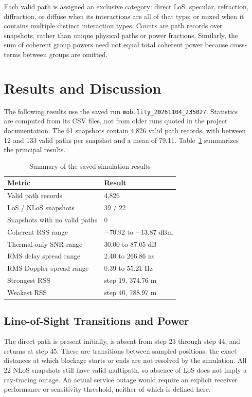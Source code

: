 \documentclass[conference]{IEEEtran}
\begin{document}
Each valid path is assigned an exclusive category: direct LoS; specular, refraction, diffraction, or diffuse when its interactions are all of that type; or mixed when it contains multiple distinct interaction types. Counts are path records over snapshots, rather than unique physical paths or power fractions. Similarly, the sum of coherent group powers need not equal total coherent power because cross-terms between groups are omitted.

\section{Results and Discussion}
The following results use the saved run \texttt{mobility\_20261104\_235027}. Statistics are computed from its CSV files, not from older runs quoted in the project documentation. The 61 snapshots contain 4,826 valid path records, with between 12 and 133 valid paths per snapshot and a mean of 79.11. Table~\ref{tab:results} summarizes the principal results.

\begin{table}[t]
\caption{Summary of the saved simulation results}
\label{tab:results}\centering
\begin{tabular}{@{}ll@{}}\toprule
Metric & Result \\ \midrule
Valid path records & 4,826 \\
LoS / NLoS snapshots & 39 / 22 \\
Snapshots with no valid paths & 0 \\
Coherent RSS range & $-70.92$ to $-13.87$ dBm \\
Thermal-only SNR range & 30.00 to 87.05 dB \\
RMS delay spread range & 2.40 to 266.86 ns \\
RMS Doppler spread range & 0.39 to 55.21 Hz \\
Strongest RSS & step 19, 374.76 m \\
Weakest RSS & step 40, 788.97 m \\
\bottomrule\end{tabular}
\end{table}

\subsection{Line-of-Sight Transitions and Power}
The direct path is present initially, is absent from step 23 through step 44, and returns at step 45. These are transitions between sampled positions: the exact distances at which blockage starts or ends are not resolved by the simulation. All 22 NLoS snapshots still have valid multipath, so absence of LoS does not imply a ray-tracing outage. An actual service outage would require an explicit receiver performance or sensitivity threshold, neither of which is defined here.
\end{document}
